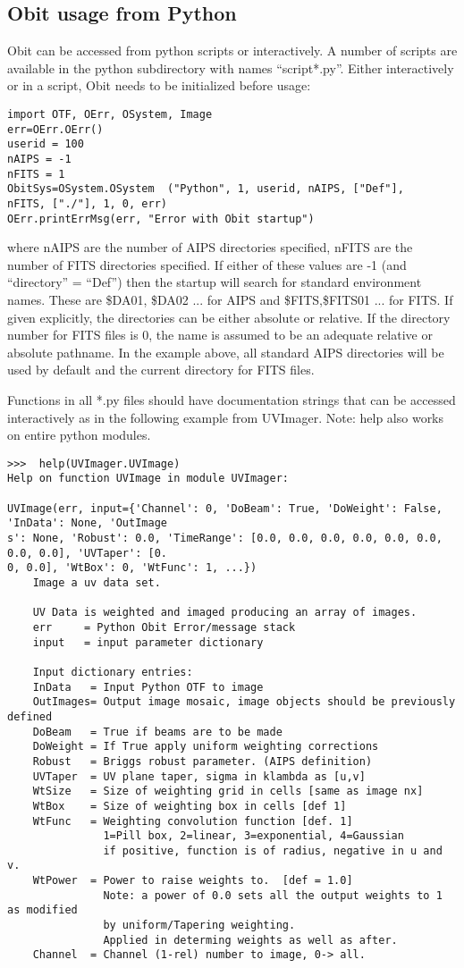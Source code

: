 \documentclass[11pt]{article}
\begin{document}
\subsection{Obit usage from Python}
Obit can be accessed from python scripts or interactively.
A number of scripts are available in the python subdirectory 
with names ``script*.py''.
Either interactively or in a script, Obit needs to be initialized
before usage:
\begin{verbatim}
import OTF, OErr, OSystem, Image
err=OErr.OErr()
userid = 100
nAIPS = -1
nFITS = 1
ObitSys=OSystem.OSystem  ("Python", 1, userid, nAIPS, ["Def"], 
nFITS, ["./"], 1, 0, err)
OErr.printErrMsg(err, "Error with Obit startup")
\end{verbatim}
where nAIPS are the number of AIPS directories specified, nFITS are
the number of FITS directories specified.
If either of these values are -1 (and ``directory'' = ``Def'') then the
startup will search for standard environment names.
These are \$DA01, \$DA02 ... for AIPS and \$FITS,\$FITS01 ... for
FITS.
If given explicitly, the directories can be either absolute or
relative.
If the directory number for FITS files is 0, the name is assumed to be
an adequate relative or absolute pathname.
In the example above, all standard AIPS directories will be used by
default and the current directory for FITS files.

Functions in all *.py files should have documentation strings that can
be accessed interactively as in the following example from UVImager.
Note: help also works on entire python modules.
\begin{verbatim}
>>>  help(UVImager.UVImage)
Help on function UVImage in module UVImager:

UVImage(err, input={'Channel': 0, 'DoBeam': True, 'DoWeight': False, 'InData': None, 'OutImage
s': None, 'Robust': 0.0, 'TimeRange': [0.0, 0.0, 0.0, 0.0, 0.0, 0.0, 0.0, 0.0], 'UVTaper': [0.
0, 0.0], 'WtBox': 0, 'WtFunc': 1, ...})
    Image a uv data set.
    
    UV Data is weighted and imaged producing an array of images.
    err     = Python Obit Error/message stack
    input   = input parameter dictionary
    
    Input dictionary entries:
    InData   = Input Python OTF to image
    OutImages= Output image mosaic, image objects should be previously defined
    DoBeam   = True if beams are to be made
    DoWeight = If True apply uniform weighting corrections
    Robust   = Briggs robust parameter. (AIPS definition)
    UVTaper  = UV plane taper, sigma in klambda as [u,v]
    WtSize   = Size of weighting grid in cells [same as image nx]
    WtBox    = Size of weighting box in cells [def 1]
    WtFunc   = Weighting convolution function [def. 1]
               1=Pill box, 2=linear, 3=exponential, 4=Gaussian
               if positive, function is of radius, negative in u and v.
    WtPower  = Power to raise weights to.  [def = 1.0]
               Note: a power of 0.0 sets all the output weights to 1 as modified
               by uniform/Tapering weighting.
               Applied in determing weights as well as after.
    Channel  = Channel (1-rel) number to image, 0-> all.
\end{verbatim}
\end{document}
